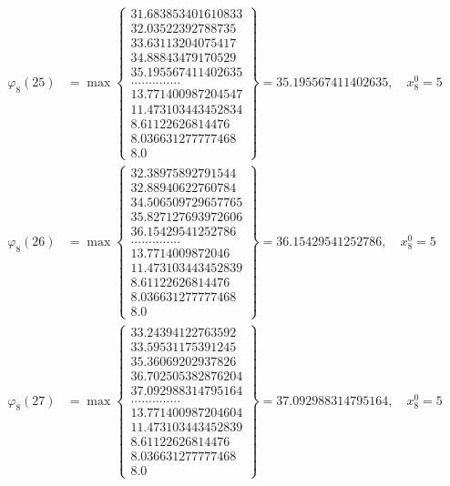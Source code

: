 \documentclass{article}
\begin{document}
\begin{align*}
  
  
  
\varphi_{8}(25) &= \max \left\{ \begin{array}{c}
31.683853401610833 \\
 32.03522392788735 \\
 33.63113204075417 \\
 34.88843479170529 \\
 35.195567411402635 \\
 .............. \\
 13.771400987204547 \\
 11.473103443452834 \\
 8.61122626814476 \\
 8.036631277777468 \\
 8.0
\end{array} \right\} = 35.195567411402635, \quad x_{8}^0 = 5\\
  
  
  
  
\varphi_{8}(26) &= \max \left\{ \begin{array}{c}
32.38975892791544 \\
 32.88940622760784 \\
 34.506509729657765 \\
 35.827127693972606 \\
 36.15429541252786 \\
 .............. \\
 13.7714009872046 \\
 11.473103443452839 \\
 8.61122626814476 \\
 8.036631277777468 \\
 8.0
\end{array} \right\} = 36.15429541252786, \quad x_{8}^0 = 5\\
  
  
  
  
\varphi_{8}(27) &= \max \left\{ \begin{array}{c}
33.24394122763592 \\
 33.59531175391245 \\
 35.36069202937826 \\
 36.702505382876204 \\
 37.092988314795164 \\
 .............. \\
 13.771400987204604 \\
 11.473103443452839 \\
 8.61122626814476 \\
 8.036631277777468 \\
 8.0
\end{array} \right\} = 37.092988314795164, \quad x_{8}^0 = 5\\
  

\end{align*}
\end{document}
